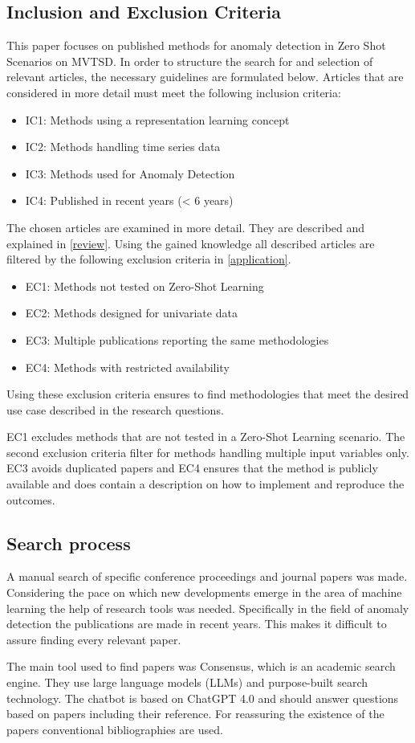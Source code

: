 \subsection{Inclusion and Exclusion Criteria}\label{criteria}
This paper focuses on published methods for anomaly detection in Zero Shot Scenarios on MVTSD. In order to structure the search for and selection of relevant articles, the necessary guidelines are formulated below. Articles that are considered in more detail must meet the following inclusion criteria:
\begin{itemize}
\item IC1: Methods using a representation learning concept
\item IC2: Methods handling time series data
\item IC3: Methods used for Anomaly Detection
\item IC4: Published in recent years (< 6 years)
\end{itemize}
The chosen articles are examined in more detail. They are described and explained in \ref{review}. Using the gained knowledge all described articles are filtered by the following exclusion criteria in \ref{application}.
\begin{itemize}
\item EC1: Methods not tested on Zero-Shot Learning
\item EC2: Methods designed for univariate data
\item EC3: Multiple publications reporting the same methodologies
\item EC4: Methods with restricted availability
\end{itemize}
Using these exclusion criteria ensures to find methodologies that meet the desired use case described in the research questions.

EC1 excludes methods that are not tested in a Zero-Shot Learning scenario. The second exclusion criteria filter for methods handling multiple input variables only. EC3 avoids duplicated papers and EC4 ensures that the method is publicly available and does contain a description on how to implement and reproduce the outcomes.
\subsection{Search process}
A manual search of specific conference proceedings and journal papers was made. Considering the pace on which new developments emerge in the area of machine learning the help of research tools was needed. Specifically in the field of anomaly detection the publications are made in recent years. This makes it difficult to assure finding every relevant paper.

The main tool used to find papers was Consensus, which is an academic search engine. They use large language models (LLMs) and purpose-built search technology. The chatbot is based on ChatGPT 4.0 and should answer questions based on papers including their reference. For reassuring the existence of the papers conventional bibliographies are used.
